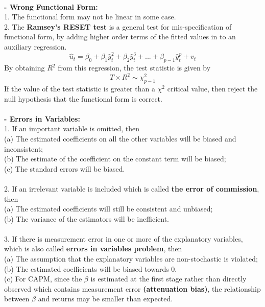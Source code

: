 \documentclass{article}
\begin{document}
\begin{enumerate}[S1 - ]
    \\
    \textbf{- Wrong Functional Form:}\\
    1. The functional form may not be linear in some case.\\
    2. The \textbf{Ramsey’s RESET test} is a general test for mis-specification of functional form, by adding higher order terms of the fitted values in to an auxiliary regression.
    \begin{equation*}
    \hat{u}_t = \beta_0 + \beta_1\hat{y}_t^2 + \beta_2\hat{y}_t^3 + ... + \beta_{p-1}\hat{y}_t^p + v_t
    \end{equation*}
    By obtaining $R^2$ from this regression, the test statistic is given by
    \begin{equation*}
    T \times R^2 \sim \chi_{p-1}^2
    \end{equation*}
    If the value of the test statistic is greater than a $\chi^2$ critical value, then reject the null hypothesis that the functional form is correct.\\
    \\
    \textbf{- Errors in Variables:}\\
    1. If an important variable is omitted, then\\
    (a) The estimated coefficients on all the other variables will be biased and inconsistent;\\
    (b) The estimate of the coefficient on the constant term will be biased;\\
    (c) The standard errors will be biased.\\
    \\
    2. If an irrelevant variable is included which is called \textbf{the error of commission}, then\\
    (a) The estimated coefficients will still be consistent and unbiased;\\
    (b) The variance of the estimators will be inefficient.\\
    \\
    3. If there is measurement error in one or more of the explanatory variables, which is also called \textbf{errors in variables problem}, then\\
    (a) The assumption that the explanatory variables are non-stochastic is violated;\\
    (b) The estimated coefficients will be biased towards 0.\\
    (c) For CAPM, since the $\beta$ is estimated at the first stage rather than directly observed which contains measurement error \textbf{(attenuation bias)}, the relationship between $\beta$ and returns may be smaller than expected.\\

\end{enumerate}
\end{document}
